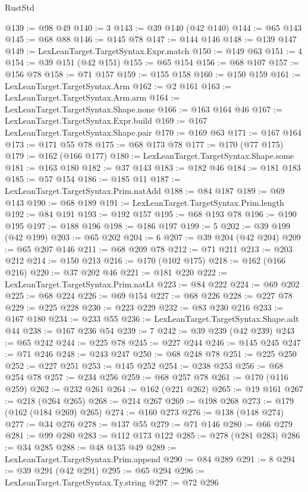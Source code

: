 \begin{lexlean}{RustStd}
\begin{coremodule}
{\begin{coremodule}
{{{{{{{{{{{{{{{{{{{{{{{{{{{{{{{{{@139 := @98 @49
@140 := 3
@143 := @39 @140 (@42 @140)
@144 := @65 @143
@145 := @68 @88
@146 := @145 @78
@147 := @144 @146
@148 := @139 @147
@149 := LexLeanTarget.TargetSyntax.Expr.match
@150 := @149 @63
@151 := 4
@154 := @39 @151 (@42 @151)
@155 := @65 @154
@156 := @68 @107
@157 := @156 @78
@158 := @71 @157
@159 := @155 @158
@160 := @150 @159
@161 := LexLeanTarget.TargetSyntax.Arm
@162 := @2 @161
@163 := LexLeanTarget.TargetSyntax.Arm.arm
@164 := LexLeanTarget.TargetSyntax.Shape.none
@166 := @163 @164 @46
@167 := LexLeanTarget.TargetSyntax.Expr.build
@169 := @167 LexLeanTarget.TargetSyntax.Shape.pair
@170 := @169 @63
@171 := @167 @164
@173 := @171 @55 @78
@175 := @68 @173 @78
@177 := @170 (@77 @175)
@179 := @162 (@166 @177)
@180 := LexLeanTarget.TargetSyntax.Shape.some
@181 := @163 @180
@182 := @37 @143
@183 := @182 @46
@184 := @181 @183
@185 := @57 @154
@186 := @185 @11
@187 := LexLeanTarget.TargetSyntax.Prim.natAdd
@188 := @84 @187
@189 := @69 @143
@190 := @68 @189
@191 := LexLeanTarget.TargetSyntax.Prim.length
@192 := @84 @191
@193 := @192 @157
@195 := @68 @193 @78
@196 := @190 @195
@197 := @188 @196
@198 := @186 @197
@199 := 5
@202 := @39 @199 (@42 @199)
@203 := @65 @202
@204 := 6
@207 := @39 @204 (@42 @204)
@209 := @65 @207 @146
@211 := @68 @209 @78
@212 := @71 @211
@213 := @203 @212
@214 := @150 @213
@216 := @170 (@102 @175)
@218 := @162 (@166 @216)
@220 := @37 @202 @46
@221 := @181 @220
@222 := LexLeanTarget.TargetSyntax.Prim.natLt
@223 := @84 @222
@224 := @69 @202
@225 := @68 @224
@226 := @69 @154
@227 := @68 @226
@228 := @227 @78
@229 := @225 @228
@230 := @223 @229
@232 := @83 @230 @216
@233 := @167 @180
@234 := @233 @55
@236 := LexLeanTarget.TargetSyntax.Shape.adt @44
@238 := @167 @236 @54
@239 := 7
@242 := @39 @239 (@42 @239)
@243 := @65 @242
@244 := @225 @78
@245 := @227 @244
@246 := @145 @245
@247 := @71 @246
@248 := @243 @247
@250 := @68 @248 @78
@251 := @225 @250
@252 := @227 @251
@253 := @145 @252
@254 := @238 @253
@256 := @68 @254 @78
@257 := @234 @256
@259 := @68 @257 @78
@261 := @170 (@116 @259)
@262 := @232 @261
@264 := @162 (@221 @262)
@265 := @19 @161
@267 := @218 (@264 @265)
@268 := @214 @267
@269 := @198 @268
@273 := @179 (@162 (@184 @269) @265)
@274 := @160 @273
@276 := @138 (@148 @274)
@277 := @34 @276
@278 := @137 @55
@279 := @71 @146
@280 := @66 @279
@281 := @99 @280
@283 := @112 @173 @122
@285 := @278 (@281 @283)
@286 := @34 @285
@288 := @48 @135 @49
@289 := LexLeanTarget.TargetSyntax.Prim.append
@290 := @84 @289
@291 := 8
@294 := @39 @291 (@42 @291)
@295 := @65 @294
@296 := LexLeanTarget.TargetSyntax.Ty.string
@297 := @72 @296
}}}}}}}}}}}}}}}}}}}}}}}}}}}}}}}}}
\end{coremodule}}
\end{coremodule}
\end{lexlean}
